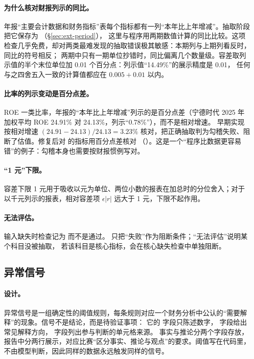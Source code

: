 \paragraph{为什么核对财报列示的同比。}
年报“主要会计数据和财务指标”表每个指标都有一列“本年比上年增减”。抽取阶段把它保存为 （\S\ref{sec:ext-period}），
这里与程序用两期数值计算的同比比较。这项检查几乎免费，却对两类最难发现的抽取错误极其敏感：本期列与上期列看反时，同比的符号相反；
两期中只有一期单位抄错时，同比偏离几个数量级。容差取列示值的半个末位单位加 0.01 个百分点：列示值“14.49\%”的展示精度是 0.01，
任何与之四舍五入一致的计算值都应在 $0.005+0.01$ 以内。

\paragraph{比率的列示变动是百分点差。}
ROE 一类比率，年报的“本年比上年增减”列示的是百分点差（宁德时代 2025 年加权平均 ROE 24.91\% 对 24.13\%，列示“0.78\%”），而不是相对增速。
早期实现按相对增速 $(24.91-24.13)/24.13=3.23\%$ 核对，把正确抽取判为勾稽失败、阻断了估值。修复后对  的指标用百分点差核对
（）。这是一个“程序比数据更容易错”的例子：勾稽本身也需要按财报惯例写对。

\paragraph{“1 元”下限。}
容差下限 1 元用于吸收以元为单位、两位小数的报表在加总时的分位舍入；对于以千元列示的报表，相对容差项 $\epsilon|r|$ 远大于 1 元，下限不起作用。

\paragraph{无法评估。}
输入缺失时检查记为  而不是通过。 只把“失败”作为阻断条件；“无法评估”说明某个科目没被抽取，
若该科目是核心指标，会在核心缺失检查中单独阻断。

\subsection{异常信号}
\label{sec:an-signals}

\paragraph{设计。}
异常信号是一组确定性的阈值规则，每条规则对应一个财务分析中公认的“需要解释”的现象。信号不是结论，而是待验证事项：
它的  字段只陈述数字， 字段给出常见解释方向， 字段列出参与判断的单元格来源。
事实与推论分两个字段存放，报告中分两行展示，对应比赛“区分事实、推论与观点”的要求。阈值写在代码里，不由模型判断，因此同样的数据永远触发同样的信号。

